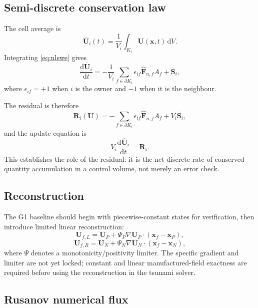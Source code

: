 \documentclass[11pt,a4paper]{article}
\newcommand{\vect}[1]{\bm{#1}}
\newcommand{\dd}{\mathrm{d}}
\newcommand{\grad}{\nabla}
\begin{document}
\subsection{Semi-discrete conservation law}

The cell average is
\begin{equation}
  \overline{\vect U}_i(t)=\frac{1}{V_i}\int_{K_i}\vect U(\vect x,t)\,\dd V.
\end{equation}
Integrating \cref{eq:nlswe} gives
\begin{equation}
  \frac{\dd \overline{\vect U}_i}{\dd t}
  =-\frac{1}{V_i}
  \sum_{f\in\partial K_i}
  \epsilon_{if}\widehat{\vect F}_{n,f} A_f
  +\overline{\vect S}_i,
  \label{eq:fvsemi}
\end{equation}
where $\epsilon_{if}=+1$ when $i$ is the owner and $-1$ when it is the neighbour.

The residual is therefore
\begin{equation}
  \vect R_i(\vect U)
  =-\sum_{f\in\partial K_i}\epsilon_{if}\widehat{\vect F}_{n,f}A_f
  +V_i\overline{\vect S}_i,
\end{equation}
and the update equation is
\begin{equation}
  V_i\frac{\dd \overline{\vect U}_i}{\dd t}=\vect R_i.
\end{equation}
This establishes the role of the residual: it is the net discrete rate of conserved-quantity accumulation in a control volume, not merely an error check.

\subsection{Reconstruction}

The G1 baseline should begin with piecewise-constant states for verification, then introduce limited linear reconstruction:
\begin{equation}
  \vect U_{f,L}=\vect U_P+\Psi_P\grad\vect U_P\cdot(\vect x_f-\vect x_P),
\end{equation}
\begin{equation}
  \vect U_{f,R}=\vect U_N+\Psi_N\grad\vect U_N\cdot(\vect x_f-\vect x_N),
\end{equation}
where $\Psi$ denotes a monotonicity/positivity limiter. The specific gradient and limiter are not yet locked; constant and linear manufactured-field exactness are required before using the reconstruction in the tsunami solver.

\subsection{Rusanov numerical flux}
\end{document}

